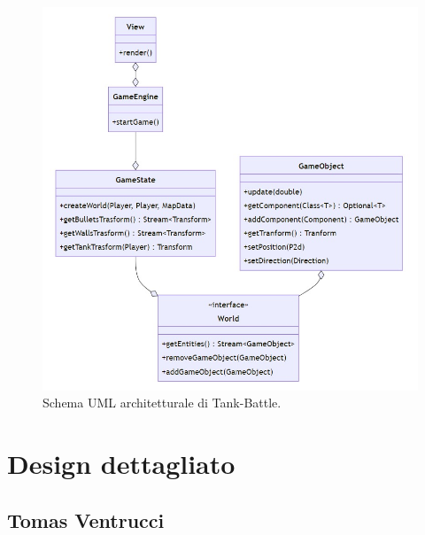 \documentclass[a4paper,12pt]{report}
\begin{document}
\begin{figure}[H]
\centering{}
\includegraphics[width=1\textwidth]{img/MVC.jpg}
\caption{Schema UML architetturale di Tank-Battle.}
\label{img:analysis}
\end{figure}

\section{Design dettagliato}
%
\subsection*{Tomas Ventrucci}
%
\end{document}
